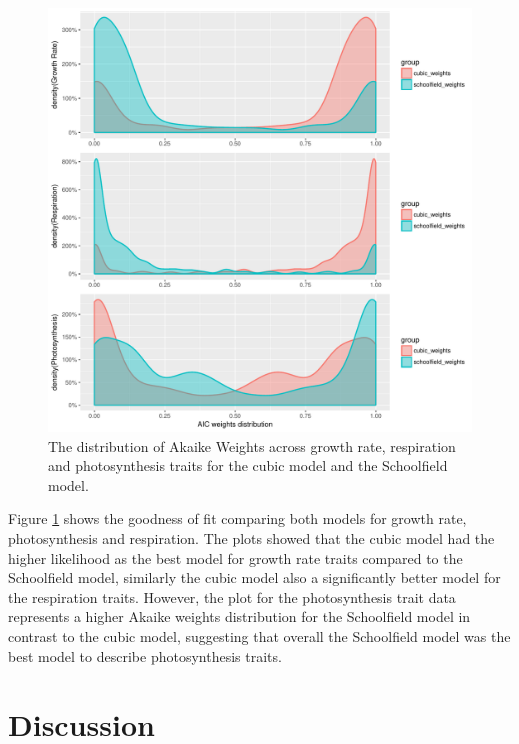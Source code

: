 {\begin{figure}[H]
	\centering
	\includegraphics[width=.9\textwidth]{../Results/trait_plot.pdf}
	\caption{\label{fig:Akaike Weights by trait}The distribution of Akaike Weights across growth rate, respiration and photosynthesis traits for the cubic model and the Schoolfield model.}
\end{figure}

Figure \ref{fig:Akaike Weights by trait} shows the goodness of fit comparing both models for growth rate, photosynthesis and respiration. The plots showed that the cubic model had the higher likelihood as the best model for growth rate traits compared to the Schoolfield model, similarly the cubic model also a significantly better model for the respiration traits. However, the plot for the photosynthesis trait data represents a higher Akaike weights distribution for the Schoolfield model in contrast to the cubic model, suggesting that overall the Schoolfield model was the best model to describe photosynthesis traits. 

\section*{Discussion}

}
